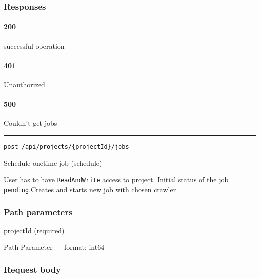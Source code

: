 \hypertarget{responses-9}{%
\subsubsection*{Responses}\label{responses-9}}

\hypertarget{section-32}{%
\paragraph{200}\label{section-32}}

successful operation

\hypertarget{section-33}{%
\paragraph{401}\label{section-33}}

Unauthorized \protect\hyperlink{}{}

\hypertarget{section-34}{%
\paragraph{500}\label{section-34}}

Couldn't get jobs \protect\hyperlink{}{}

\begin{center}\rule{0.5\linewidth}{0.5pt}\end{center}

\protect\hypertarget{schedule}{}{}



\begin{verbatim}
post /api/projects/{projectId}/jobs
\end{verbatim}

Schedule onetime job ({schedule})

User has to have \texttt{ReadAndWrite} access to project. Initial status
of the job = \texttt{pending}.Creates and starts new job with chosen
crawler

\hypertarget{path-parameters-8}{%
\subsubsection*{Path parameters}\label{path-parameters-8}}

projectId (required)

{Path Parameter} --- format: int64

\hypertarget{request-body-2}{%
\subsubsection*{Request body}\label{request-body-2}}

